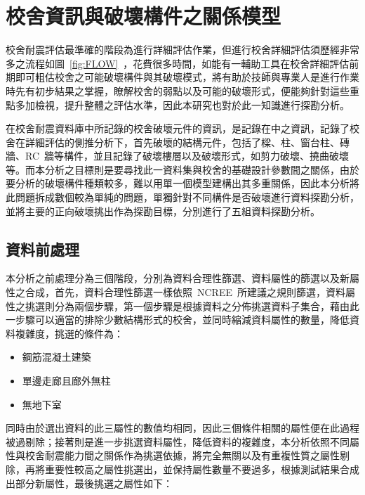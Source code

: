 \renewcommand\thetable{\arabic{chapter}-\arabic{table}}
\chapter{校舍資訊與破壞構件之關係模型}
\label{cha:crack} 

校舍耐震評估最準確的階段為進行詳細評估作業，但進行校舍詳細評估須歷經非常多之流程如圖~\ref{fig:FLOW}~，花費很多時間，如能有一輔助工具在校舍詳細評估前期即可粗估校舍之可能破壞構件與其破壞模式，將有助於技師與專業人是進行作業時先有初步結果之掌握，瞭解校舍的弱點以及可能的破壞形式，便能夠針對這些重點多加檢視，提升整體之評估水準，因此本研究也對於此一知識進行探勘分析。

在校舍耐震資料庫中所記錄的校舍破壞元件的資訊，是記錄在中之資訊，記錄了校舍在詳細評估的側推分析下，首先破壞的結構元件，包括了樑、柱、窗台柱、磚牆、RC~牆等構件，並且記錄了破壞樓層以及破壞形式，如剪力破壞、撓曲破壞等。而本分析之目標則是要尋找此一資料集與校舍的基礎設計參數間之關係，由於要分析的破壞構件種類較多，難以用單一個模型建構出其多重關係，因此本分析將此問題拆成數個較為單純的問題，單獨針對不同構件是否破壞進行資料探勘分析，並將主要的正向破壞挑出作為探勘目標，分別進行了五組資料探勘分析。


\section{資料前處理}

本分析之前處理分為三個階段，分別為資料合理性篩選、資料屬性的篩選以及新屬性之合成，首先，資料合理性篩選一樣依照~NCREE~所建議之規則篩選，資料屬性之挑選則分為兩個步驟，第一個步驟是根據資料之分佈挑選資料子集合，藉由此一步驟可以適當的排除少數結構形式的校舍，並同時縮減資料屬性的數量，降低資料複雜度，挑選的條件為：

\begin{itemize}
\item 鋼筋混凝土建築
\item 單邊走廊且廊外無柱
\item 無地下室
\end{itemize}

同時由於選出資料的此三屬性的數值均相同，因此三個條件相關的屬性便在此過程被過剔除；接著則是進一步挑選資料屬性，降低資料的複雜度，本分析依照不同屬性與校舍耐震能力間之關係作為挑選依據，將完全無關以及有重複性質之屬性剔除，再將重要性較高之屬性挑選出，並保持屬性數量不要過多，根據測試結果合成出部分新屬性，最後挑選之屬性如下：

